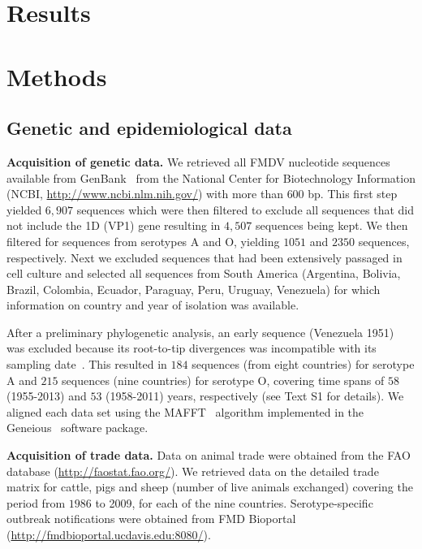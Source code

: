 \documentclass[10pt]{article}
\begin{document}
\section*{Results}

\section*{Methods}

\subsection*{Genetic and epidemiological data}

\textbf{Acquisition of genetic data.}
We retrieved all FMDV nucleotide sequences available from GenBank~\citep{Benson2013} from the National Center for Biotechnology Information (NCBI, \url{ http://www.ncbi.nlm.nih.gov/}) with more than $600$ bp.
This first step yielded $6, 907$ sequences which were then filtered to exclude all sequences that did not include the 1D (VP1) gene resulting in $4, 507$ sequences being kept.
We then filtered for sequences from serotypes A and O, yielding $1051$ and $2350$ sequences, respectively.
Next we excluded sequences that had been extensively passaged in cell culture and selected all sequences from South America (Argentina, Bolivia, Brazil, Colombia, Ecuador, Paraguay, Peru, Uruguay, Venezuela) for which information on country and year of isolation was available.

After a preliminary phylogenetic analysis, an early sequence (Venezuela 1951) was excluded because its root-to-tip divergences was incompatible with its sampling date~\citep{Rambaut2016}.
This resulted in $184$ sequences (from eight countries) for serotype A and $215$ sequences (nine countries) for serotype O, covering time spans of $58$ (1955-2013) and $53$ (1958-2011) years, respectively (see Text S1 for details).
We aligned each data set using the MAFFT~\citep{Katoh2002} algorithm implemented in the Geneious~\citep{Kearse2012} software package.

\textbf{Acquisition of trade data.}
Data on animal trade were obtained from the FAO database (\url{http://faostat.fao.org/}).
We retrieved data on the detailed trade matrix for cattle, pigs and sheep (number of live animals exchanged) covering the period from $1986$ to 2009, for each of the nine countries.
Serotype-specific outbreak notifications were obtained from FMD Bioportal (\url{http://fmdbioportal.ucdavis.edu:8080/}).
\end{document}
